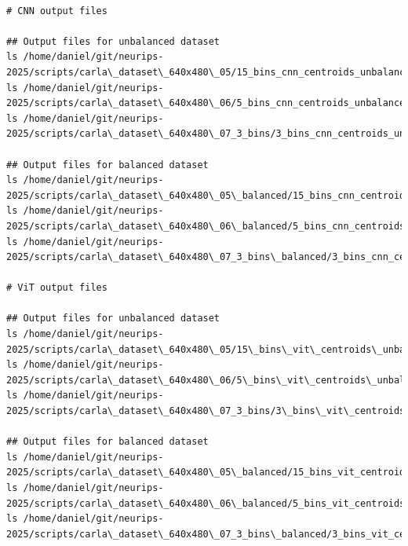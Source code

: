 \begin{verbatim}

# CNN output files

## Output files for unbalanced dataset
ls /home/daniel/git/neurips-2025/scripts/carla\_dataset\_640x480\_05/15_bins_cnn_centroids_unbalanced.npy
ls /home/daniel/git/neurips-2025/scripts/carla\_dataset\_640x480\_06/5_bins_cnn_centroids_unbalanced.npy
ls /home/daniel/git/neurips-2025/scripts/carla\_dataset\_640x480\_07_3_bins/3_bins_cnn_centroids_unbalanced.npy

## Output files for balanced dataset
ls /home/daniel/git/neurips-2025/scripts/carla\_dataset\_640x480\_05\_balanced/15_bins_cnn_centroids\_balanced.npy
ls /home/daniel/git/neurips-2025/scripts/carla\_dataset\_640x480\_06\_balanced/5_bins_cnn_centroids\_balanced.npy
ls /home/daniel/git/neurips-2025/scripts/carla\_dataset\_640x480\_07_3_bins\_balanced/3_bins_cnn_centroids\_balanced.npy

# ViT output files

## Output files for unbalanced dataset
ls /home/daniel/git/neurips-2025/scripts/carla\_dataset\_640x480\_05/15\_bins\_vit\_centroids\_unbalanced.npy
ls /home/daniel/git/neurips-2025/scripts/carla\_dataset\_640x480\_06/5\_bins\_vit\_centroids\_unbalanced.npy
ls /home/daniel/git/neurips-2025/scripts/carla\_dataset\_640x480\_07_3_bins/3\_bins\_vit\_centroids\_unbalanced.npy

## Output files for balanced dataset
ls /home/daniel/git/neurips-2025/scripts/carla\_dataset\_640x480\_05\_balanced/15_bins_vit_centroids\_balanced.npy
ls /home/daniel/git/neurips-2025/scripts/carla\_dataset\_640x480\_06\_balanced/5_bins_vit_centroids\_balanced.npy
ls /home/daniel/git/neurips-2025/scripts/carla\_dataset\_640x480\_07_3_bins\_balanced/3_bins_vit_centroids\_balanced.npy


\end{verbatim}
